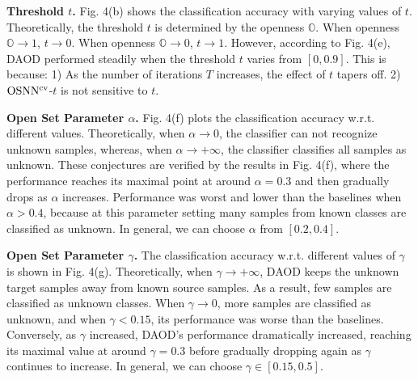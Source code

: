 \documentclass[journal]{IEEEtran}
\begin{document}
\textbf{{Threshold $t$.}} Fig. 4(b) shows the classification accuracy with varying values of $t$. Theoretically, the threshold $t$ is determined by the openness $\mathbb{O}$. When openness $\mathbb{O}\to 1$, $t\to 0$. When  openness $\mathbb{O}\to 0$, $t\to 1$. However, according to Fig. 4(e), DAOD performed steadily when the threshold $t$ varies from $[0,0.9]$. This is because: 1) As the number of iterations $T$ increases, the effect of $t$ tapers off. 2) ${\rm OSNN^{cv}}$-$t$ is not sensitive to $t$.

{\textbf{Open Set Parameter $\alpha$.}} Fig. 4(f) plots the classification accuracy w.r.t. different values. Theoretically, when $\alpha \to 0$, the classifier can not recognize unknown samples, whereas, when $\alpha \to +\infty$, the classifier classifies all samples as unknown. These conjectures are verified by the results in Fig. 4(f), where the performance reaches its maximal point at around $\alpha=0.3$ and then gradually drops as $\alpha$ increases. Performance was worst and lower than the baselines when $\alpha>0.4$, because at this parameter setting many samples from known classes are classified as unknown. In general, we can choose $\alpha$ from $[0.2,0.4]$.

{\textbf{Open Set Parameter $\gamma$.}} The classification accuracy w.r.t. different values of $\gamma$ is shown in Fig. 4(g). Theoretically, when $\gamma \to +\infty$, DAOD keeps the unknown target samples away from known source samples. As a result, few samples are classified as unknown classes. When $\gamma \to 0$, more samples are classified as unknown, and when $\gamma < 0.15$, its performance was worse than the baselines. Conversely, as $\gamma$ increased, DAOD's performance dramatically increased, reaching its maximal value at around $\gamma=0.3$ before gradually dropping again as $\gamma$ continues to increase. In general, we can choose $\gamma\in[0.15,0.5]$.

 
\end{document}

